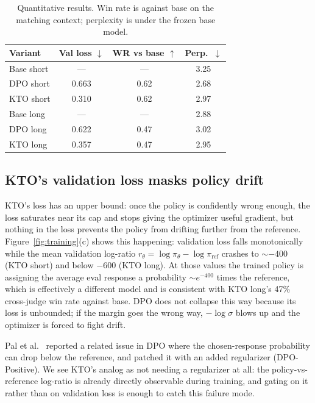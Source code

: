 \begin{table}[!htb]
\centering
\small
\setlength{\tabcolsep}{6pt}
\begin{tabular}{lccc}
\toprule
Variant & Val loss $\downarrow$ & WR vs base $\uparrow$ & Perp.\ $\downarrow$ \\
\midrule
Base short              & ---    & ---  & 3.25 \\
DPO short    & 0.663  & 0.62 & 2.68 \\
KTO short    & 0.310  & 0.62 & 2.97 \\
\midrule
Base long               & ---    & ---  & 2.88 \\
DPO long    & 0.622  & 0.47 & 3.02 \\
KTO long    & 0.357  & 0.47 & 2.95 \\
\bottomrule
\end{tabular}
\caption{Quantitative results.  Win rate is against base on the matching context; perplexity is under the frozen base model.}
\label{tab:quant}
\end{table}

\subsection{KTO's validation loss masks policy drift}
\label{sec:ktodrift}
KTO's loss has an upper bound: once the policy is confidently wrong enough, the loss saturates near its cap and stops giving the optimizer useful gradient, but nothing in the loss prevents the policy from drifting further from the reference.  Figure~\ref{fig:training}(c) shows this happening: validation loss falls monotonically while the mean validation log-ratio $r_\theta = \log\pi_\theta - \log\pi_\text{ref}$ crashes to $\sim-400$ (KTO short) and below $-600$ (KTO long).  At those values the trained policy is assigning the average eval response a probability $\sim e^{-400}$ times the reference, which is effectively a different model and is consistent with KTO long's 47\% cross-judge win rate against base.  DPO does not collapse this way because its loss is unbounded; if the margin goes the wrong way, $-\log\sigma$ blows up and the optimizer is forced to fight drift.

Pal et al.\ \cite{pal2024smaug} reported a related issue in DPO where the chosen-response probability can drop below the reference, and patched it with an added regularizer (DPO-Positive).  We see KTO's analog as not needing a regularizer at all: the policy-vs-reference log-ratio is already directly observable during training, and gating on it rather than on validation loss is enough to catch this failure mode.

